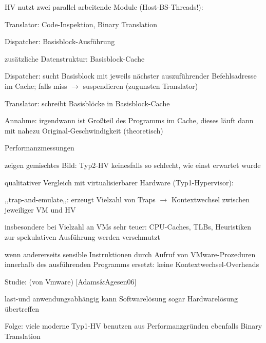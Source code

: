 \documentclass[a4paper]{article}
\begin{document}
\begin{multicols}{3}
    \begin{itemize*}
        \item
        HV nutzt zwei parallel arbeitende Module (Host-BS-Threads!):
        \begin{itemize*}
            \item Translator: Code-Inspektion, Binary Translation
            \item Dispatcher: Basisblock-Ausführung
        \end{itemize*}
        \item
        zusätzliche Datenstruktur: Basisblock-Cache
        \item
        Dispatcher: sucht Basisblock mit jeweils nächster auszuführender
        Befehlsadresse im Cache; falls miss $\rightarrow$
        suspendieren (zugunsten Translator)
        \item
        Translator: schreibt Basisblöcke in Basisblock-Cache
        \item
        Annahme: irgendwann ist Großteil des Programms im Cache, dieses läuft
        dann mit nahezu Original-Geschwindigkeit (theoretisch)
    \end{itemize*}

    Performanzmessungen

    \begin{itemize*}
        \item
        zeigen gemischtes Bild: Typ2-HV keinesfalls so schlecht, wie einst
        erwartet wurde
        \item
        qualitativer Vergleich mit virtualisierbarer Hardware
        (Typ1-Hypervisor):
        \item
        ,,trap-and-emulate,,: erzeugt Vielzahl von Traps
        $\rightarrow$ Kontextwechsel zwischen jeweiliger VM
        und HV
        \item
        insbesondere bei Vielzahl an VMs sehr teuer: CPU-Caches, TLBs,
        Heuristiken zur spekulativen Ausführung werden verschmutzt
        \item
        wenn andererseits sensible Instruktionen durch Aufruf von
        VMware-Prozeduren innerhalb des ausführenden Programms ersetzt: keine
        Kontextwechsel-Overheads
    \end{itemize*}

    Studie: (von Vmware) [Adams\&Agesen06]

    \begin{itemize*}
        \item
        last-und anwendungsabhängig kann Softwarelösung sogar Hardwarelösung
        übertreffen
        \item
        Folge: viele moderne Typ1-HV benutzen aus Performanzgründen ebenfalls
        Binary Translation
    \end{itemize*}



\end{multicols}
\end{document}
